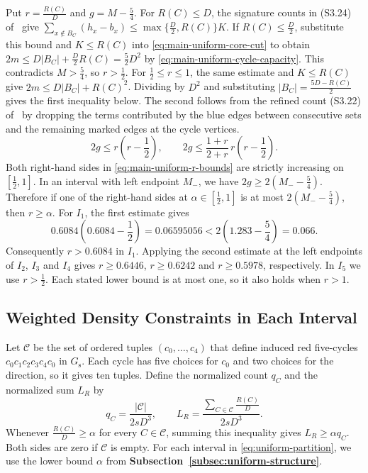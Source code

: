 \documentclass[preprint,11pt,numbers]{elsarticle-arxiv}
\numberwithin{equation}{section}
\theoremstyle{definition}
\begin{document}
Put $r=\frac{R(C)}{D}$ and $g=M-\frac54$. For $R(C)\leq D$,
the signature counts in (S3.24) of~\cite{FGSTSupplement} give
$\sum_{x\notin B_C}(h_x-b_x)\leq\max\{\frac D2,R(C)\}K$.
If $R(C)\leq\frac D2$, substitute this bound and $K\leq R(C)$
into \eqref{eq:main-uniform-core-cut} to obtain
$2m\leq D|B_C|+\frac D2R(C)=\frac52D^2$ by
\eqref{eq:main-uniform-cycle-capacity}. This contradicts
$M>\frac54$, so $r>\frac12$.
For $\frac12\leq r\leq1$, the same estimate and $K\leq R(C)$ give
$2m\leq D|B_C|+R(C)^2$. Dividing by $D^2$ and substituting
$|B_C|=\frac{5D-R(C)}{2}$ gives the first inequality below.
The second follows from the refined
count (S3.22) of~\cite{FGSTSupplement} by dropping
the terms contributed by the blue edges between consecutive sets
and the remaining marked edges at the cycle vertices.
\begin{equation}\label{eq:main-uniform-r-bounds}
 2g\leq r\left(r-\frac12\right),\qquad
 2g\leq\frac{1+r}{2+r}\,r\left(r-\frac12\right).
\end{equation}
Both right-hand sides in \eqref{eq:main-uniform-r-bounds}
are strictly increasing on $[\frac12,1]$. In an interval with
left endpoint $M_-$, we have $2g\geq2(M_--\frac54)$. Therefore
if one of the right-hand sides at $\alpha\in[\frac12,1]$ is
at most $2(M_--\frac54)$, then $r\geq\alpha$.
For $I_1$, the first estimate gives
\[
 0.6084\left(0.6084-\frac12\right)=0.06595056
 <2\left(1.283-\frac54\right)=0.066.
\]
Consequently $r>0.6084$ in $I_1$. Applying the second estimate
at the left endpoints of $I_2$, $I_3$ and $I_4$ gives
$r\geq0.6446$, $r\geq0.6242$ and $r\geq0.5978$, respectively.
In $I_5$ we use $r>\frac12$. Each stated lower bound is at most
one, so it also holds when $r>1$.

\subsection{Weighted Density Constraints in Each Interval}
\label{subsec:uniform-weighted-constraints}

Let $\mathcal C$ be the set of ordered tuples $(c_0,\ldots,c_4)$
that define induced red five-cycles $c_0c_1c_2c_3c_4c_0$ in
$G_{\mathrm s}$. Each cycle has five choices for $c_0$ and
two choices for the direction, so it gives ten tuples.
Define the normalized count $q_C$ and the normalized sum $L_R$ by
\begin{equation}\label{eq:ordered-cycle-densities}
 q_C=\frac{|\mathcal C|}{2sD^3},\qquad
 L_R=\frac{\sum_{C\in\mathcal C}\frac{R(C)}{D}}{2sD^3}.
\end{equation}
Whenever $\frac{R(C)}{D}\geq\alpha$ for every $C\in\mathcal C$,
summing this inequality gives $L_R\geq\alpha q_C$. Both sides
are zero if $\mathcal C$ is empty. For each interval in
\eqref{eq:uniform-partition}, we use the lower bound $\alpha$
from \textbf{Subsection~\ref{subsec:uniform-structure}}.
\end{document}
